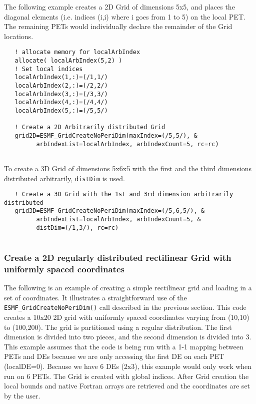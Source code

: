    The following example creates a 2D Grid of dimensions 5x5, and places
   the diagonal elements (i.e. indices (i,i) where i goes from 1 to 5)
   on the local PET. The remaining PETs would individually declare
   the remainder of the Grid locations. 

 \begin{verbatim}
   ! allocate memory for localArbIndex
   allocate( localArbIndex(5,2) )
   ! Set local indices
   localArbIndex(1,:)=(/1,1/)
   localArbIndex(2,:)=(/2,2/)
   localArbIndex(3,:)=(/3,3/)
   localArbIndex(4,:)=(/4,4/)
   localArbIndex(5,:)=(/5,5/)

   ! Create a 2D Arbitrarily distributed Grid
   grid2D=ESMF_GridCreateNoPeriDim(maxIndex=(/5,5/), &
         arbIndexList=localArbIndex, arbIndexCount=5, rc=rc)
 
\end{verbatim}
 

  
   To create a 3D Grid of dimensions 5x6x5 with the first and the third dimensions distributed arbitrarily,
   {\tt distDim} is used. 

 \begin{verbatim}
   ! Create a 3D Grid with the 1st and 3rd dimension arbitrarily distributed
   grid3D=ESMF_GridCreateNoPeriDim(maxIndex=(/5,6,5/), &
         arbIndexList=localArbIndex, arbIndexCount=5, &
         distDim=(/1,3/), rc=rc)
 
\end{verbatim}
 

  \subsubsection{Create a 2D regularly distributed rectilinear Grid
                    with uniformly spaced coordinates}
   \label{example:2DRegUniGrid}
  
   The following is an example of creating a simple rectilinear grid
   and loading in a set of coordinates. It illustrates a straightforward use
   of the {\tt ESMF\_GridCreateNoPeriDim()} call described in the previous section.
   This code creates a 10x20 2D grid with uniformly spaced coordinates varying from (10,10) to (100,200).
   The grid is partitioned using a regular distribution. The first dimension
   is divided into two pieces, and the second dimension is divided into 3.
   This example assumes that the code is being run with a 1-1 mapping between
   PETs and DEs because we are only accessing the first DE on each PET (localDE=0).
   Because we have 6 DEs (2x3), this example would only work when run on 6 PETs.
   The Grid is created with global indices. After Grid creation the
   local bounds and native Fortran arrays are retrieved and the
   coordinates are set by the user.
   
